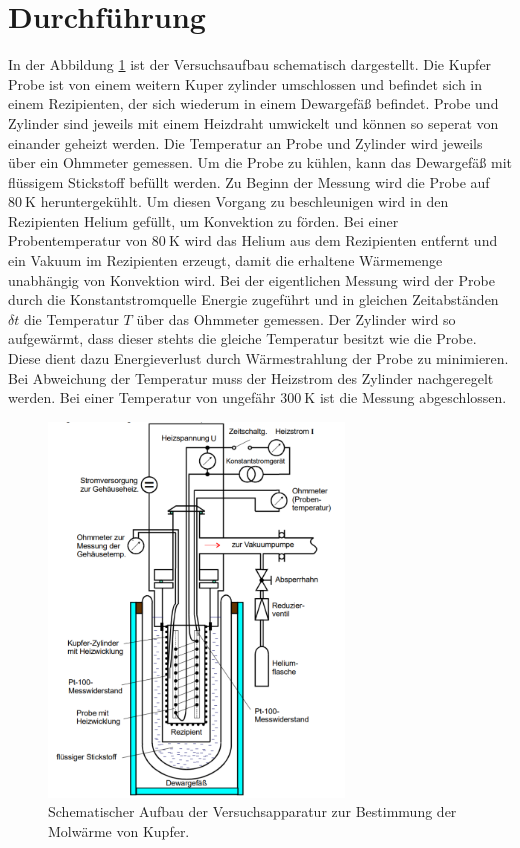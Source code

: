 \section{Durchführung}
\label{sec:Durchführung}
In der Abbildung \ref{fig:aufbau} ist der Versuchsaufbau schematisch
dargestellt. Die Kupfer Probe ist von einem weitern Kuper zylinder
umschlossen und
befindet sich
in einem Rezipienten, der sich wiederum in einem
Dewargefäß befindet. Probe und Zylinder
sind jeweils mit einem Heizdraht umwickelt und können so
seperat von einander geheizt werden.
Die Temperatur an Probe und Zylinder wird jeweils über ein Ohmmeter
gemessen.
Um die Probe
zu kühlen, kann das Dewargefäß mit flüssigem Stickstoff
befüllt werden.
Zu Beginn der Messung wird die Probe auf $\SI{80}{\kelvin}$
heruntergekühlt.
Um diesen Vorgang zu beschleunigen wird in den Rezipienten Helium
gefüllt, um Konvektion zu förden. Bei einer Probentemperatur von $\SI{80}{\kelvin}$ wird das Helium aus dem
Rezipienten entfernt und ein
Vakuum im Rezipienten
erzeugt, damit die erhaltene Wärmemenge unabhängig von Konvektion wird.
Bei der eigentlichen Messung wird der Probe durch die Konstantstromquelle
Energie zugeführt und
in gleichen Zeitabständen $\delta t$
die Temperatur $T$ über das Ohmmeter gemessen.
Der Zylinder wird so aufgewärmt, dass
dieser stehts die gleiche Temperatur
besitzt wie die Probe.
Diese dient dazu Energieverlust
durch Wärmestrahlung der Probe zu minimieren.
Bei Abweichung der Temperatur muss der Heizstrom des Zylinder
nachgeregelt werden. Bei einer Temperatur von ungefähr $\SI{300}{\kelvin}$
ist die Messung abgeschlossen.



\begin{figure}
\centering
\includegraphics[width=0.7\textwidth]{Aufbau.PNG}
\caption{Schematischer Aufbau der Versuchsapparatur zur Bestimmung der Molwärme von Kupfer.}
\label{fig:aufbau}
\end{figure}

